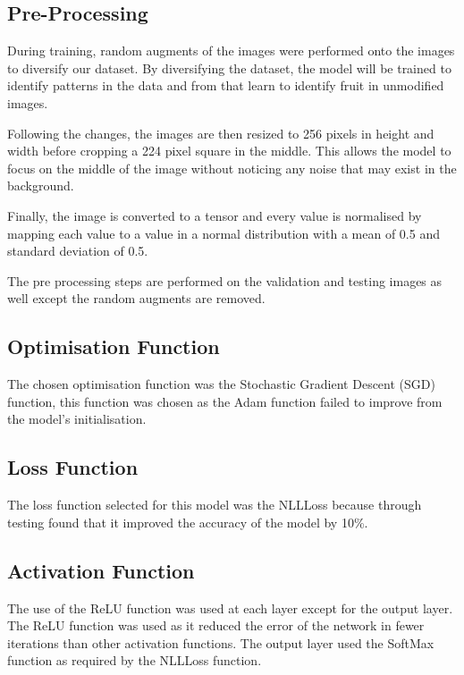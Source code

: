 \documentclass[../main.tex]{subfiles}
\begin{document}
\subsection{Pre-Processing}

During training, random augments of the images were performed onto the images to diversify our dataset. By diversifying the dataset, the model will be trained to identify patterns in the data and from that learn to identify fruit in unmodified images. 

Following the changes, the images are then resized to 256 pixels in height and width before cropping a 224 pixel square in the middle. This allows the model to focus on the middle of the image without noticing any noise that may exist in the background. 

Finally, the image is converted to a tensor and every value is normalised by mapping each value to a value in a normal distribution with a mean of 0.5 and standard deviation of 0.5.

The pre processing steps are performed on the validation and testing images as well except the random augments are removed. 

\subsection{Optimisation Function}

The chosen optimisation function was the Stochastic Gradient Descent (SGD) function, this function was chosen as the Adam function failed to improve from the model's initialisation.

\subsection{Loss Function}

The loss function selected for this model was the NLLLoss because through testing found that it improved the accuracy of the model by 10\%. 

\subsection{Activation Function}

The use of the ReLU function was used at each layer except for the output layer. The ReLU function was used as it reduced the error of the network in fewer iterations than other activation functions. The output layer used the SoftMax function as required by the NLLLoss function. 
\end{document}
